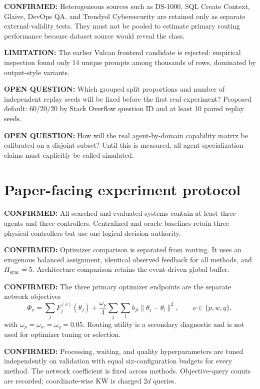 \documentclass[11pt]{article}
\newcommand{\Confirmed}[1]{\par\noindent\textcolor{confirmed}{\textbf{CONFIRMED:} #1}\par}
\newcommand{\Question}[1]{\par\noindent\textcolor{question}{\textbf{OPEN QUESTION:} #1}\par}
\newcommand{\Warning}[1]{\par\noindent\textcolor{warning}{\textbf{LIMITATION:} #1}\par}
\begin{document}
\Confirmed{Heterogeneous sources such as DS-1000, SQL Create Context, Glaive,
DevOps QA, and Trendyol Cybersecurity are retained only as separate
external-validity tests.  They must not be pooled to estimate primary routing
performance because dataset source would reveal the class.}

\Warning{The earlier Vulcan frontend candidate is rejected: empirical
inspection found only 14 unique prompts among thousands of rows, dominated by
output-style variants.}

\Question{Which grouped split proportions and number of independent replay
seeds will be fixed before the first real experiment?  Proposed default:
60/20/20 by Stack Overflow question ID and at least 10 paired replay seeds.}

\Question{How will the real agent-by-domain capability matrix be calibrated on
a disjoint subset?  Until this is measured, all agent specialization claims
must explicitly be called simulated.}
\section{Paper-facing experiment protocol}

\Confirmed{All searched and evaluated systems contain at least three agents
and three controllers. Centralized and oracle baselines retain three physical
controllers but use one logical decision authority.}

\Confirmed{Optimizer comparison is separated from routing. It uses an
exogenous balanced assignment, identical observed feedback for all methods,
and $H_{\mathrm{sync}}=5$. Architecture comparison retains the event-driven
global buffer.}

\Confirmed{The three primary optimizer endpoints are the separate network
objectives
\begin{equation}
\Phi_{\nu}=\sum_j F_j^{(\nu)}(\theta_j)
 +\frac{\omega_{\nu}}{4}\sum_j\sum_l b_{jl}
 \lVert\theta_j-\theta_l\rVert^2,
 \qquad \nu\in\{p,w,q\},
\end{equation}
with $\omega_p=\omega_w=\omega_q=0.05$. Routing utility is a secondary
diagnostic and is not used for optimizer tuning or selection.}

\Confirmed{Processing, waiting, and quality hyperparameters are tuned
independently on validation with equal six-configuration budgets for every
method. The network coefficient is fixed across methods. Objective-query counts
are recorded; coordinate-wise KW is charged $2d$ queries.}
\end{document}

